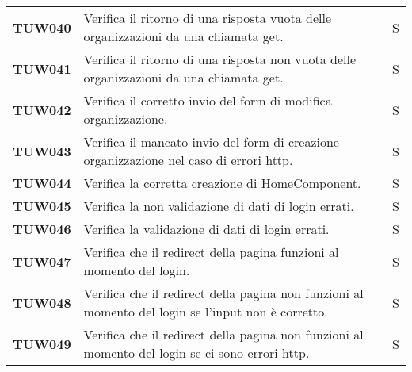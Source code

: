 \documentclass[../../piano-di-qualifica.tex]{subfiles}
\begin{document}
\begin{longtable}[H]{>{\centering\bfseries}m{3cm} >{}m{10cm} >{\centering\arraybackslash}m{3cm}}
  TUW040             & Verifica il ritorno di una risposta vuota delle organizzazioni da una chiamata get.                                 & S                             \\

  TUW041             & Verifica il ritorno di una risposta non vuota delle organizzazioni da una chiamata get.                             & S                             \\

  TUW042             & Verifica il corretto invio del form di modifica organizzazione.                                                     & S                             \\

  TUW043             & Verifica il mancato invio del form di creazione organizzazione nel caso di errori http.                             & S                             \\




  TUW044             & Verifica la corretta creazione di HomeComponent.                                                                    & S                             \\

  TUW045             & Verifica la non validazione di dati di login errati.                                                                & S                             \\

  TUW046             & Verifica la validazione di dati di login errati.                                                                    & S                             \\

  TUW047             & Verifica che il redirect della pagina funzioni al momento del login.                                                & S                             \\

  TUW048             & Verifica che il redirect della pagina non funzioni al momento del login se l'input non è corretto.                  & S                             \\

  TUW049             & Verifica che il redirect della pagina non funzioni al momento del login se ci sono errori http.                     & S                             \\


\end{longtable}
\end{document}
